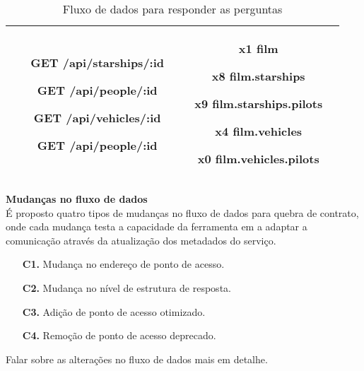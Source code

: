 \begin{table}[H]
\begin{tabular}{|c|c|c|}
\begin{minipage}[t]{0.3\textwidth}
\begin{itemize}
        \item[\textbf{GET}] /api/starships/:id
        \item[\textbf{GET}] /api/people/:id
        \item[\textbf{GET}] /api/vehicles/:id
        \item[\textbf{GET}] /api/people/:id
      \end{itemize}
    \end{minipage} & \begin{minipage}[t]{0.5\textwidth}
      \begin{itemize}
        \item[\textbf{x1}] film
        \item[\textbf{x8}] film.starships
        \item[\textbf{x9}] film.starships.pilots
        \item[\textbf{x4}] film.vehicles
        \item[\textbf{x0}] film.vehicles.pilots
      \end{itemize}
    \end{minipage} \\
    \hline
  \end{tabular}
  \caption{Fluxo de dados para responder as perguntas}
\end{table}

\textbf{Mudanças no fluxo de dados} \\

É proposto quatro tipos de mudanças no fluxo de dados para quebra de contrato, onde cada mudança testa a capacidade da ferramenta em a adaptar a comunicação através da atualização dos metadados do serviço.

\begin{enumerate}
\item[\textbf{C1.}] Mudança no endereço de ponto de acesso.
\item[\textbf{C2.}] Mudança no nível de estrutura de resposta.
\item[\textbf{C3.}] Adição de ponto de acesso otimizado.
\item[\textbf{C4.}] Remoção de ponto de acesso deprecado.
\end{enumerate}

Falar sobre as alterações no fluxo de dados mais em detalhe.

